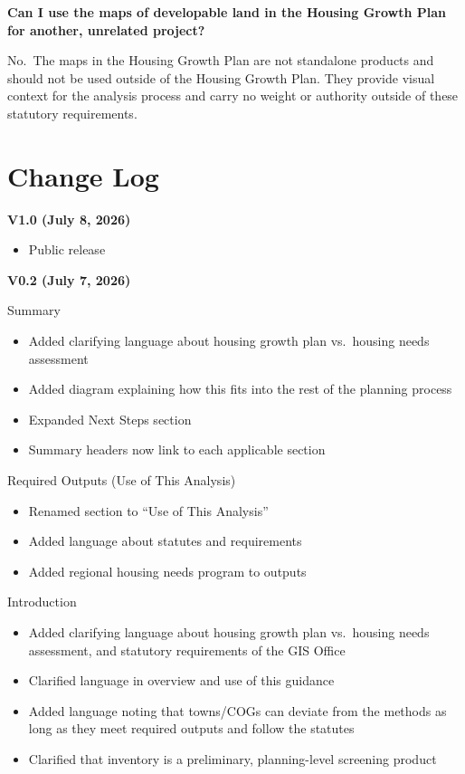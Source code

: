 \documentclass[
  letterpaper,
  DIV=11,
  numbers=noendperiod]{scrreprt}
\providecommand{\tightlist}{%
  \setlength{\itemsep}{0pt}\setlength{\parskip}{0pt}}
\begin{document}
\textbf{Can I use the maps of developable land in the Housing Growth
Plan for another, unrelated project?}

No.~The maps in the Housing Growth Plan are not standalone products and
should not be used outside of the Housing Growth Plan. They provide
visual context for the analysis process and carry no weight or authority
outside of these statutory requirements.

\chapter{Change Log}\label{change-log}

\textbf{V1.0 (July 8, 2026)}

\begin{itemize}
\tightlist
\item
  Public release
\end{itemize}

\textbf{V0.2 (July 7, 2026)}

Summary

\begin{itemize}
\tightlist
\item
  Added clarifying language about housing growth plan vs.~housing needs
  assessment
\item
  Added diagram explaining how this fits into the rest of the planning
  process
\item
  Expanded Next Steps section
\item
  Summary headers now link to each applicable section
\end{itemize}

Required Outputs (Use of This Analysis)

\begin{itemize}
\tightlist
\item
  Renamed section to ``Use of This Analysis''
\item
  Added language about statutes and requirements
\item
  Added regional housing needs program to outputs
\end{itemize}

Introduction

\begin{itemize}
\tightlist
\item
  Added clarifying language about housing growth plan vs.~housing needs
  assessment, and statutory requirements of the GIS Office
\item
  Clarified language in overview and use of this guidance
\item
  Added language noting that towns/COGs can deviate from the methods as
  long as they meet required outputs and follow the statutes
\item
  Clarified that inventory is a preliminary, planning-level screening
  product
\end{itemize}
\end{document}
